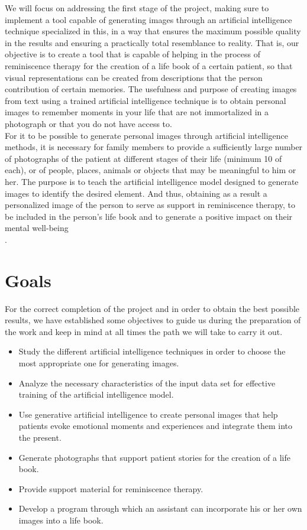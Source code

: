 We will focus on addressing the first stage of the project, making sure to implement a tool capable of generating images through an artificial intelligence technique specialized in this, in a way that ensures the maximum possible quality in the results and ensuring a practically total resemblance to reality. That is, our objective is to create a tool that is capable of helping in the process of reminiscence therapy for the creation of a life book of a certain patient, so that visual representations can be created from descriptions that the person contribution of certain memories. The usefulness and purpose of creating images from text using a trained artificial intelligence technique is to obtain personal images to remember moments in your life that are not immortalized in a photograph or that you do not have access to. \\

For it to be possible to generate personal images through artificial intelligence methods, it is necessary for family members to provide a sufficiently large number of photographs of the patient at different stages of their life (minimum 10 of each), or of people, places, animals or objects that may be meaningful to him or her. The purpose is to teach the artificial intelligence model designed to generate images to identify the desired element. And thus, obtaining as a result a personalized image of the person to serve as support in reminiscence therapy, to be included in the person's life book and to generate a positive impact on their mental well-being \\.


\section{Goals}

For the correct completion of the project and in order to obtain the best possible results, we have established some objectives to guide us during the preparation of the work and keep in mind at all times the path we will take to carry it out. 

\begin{itemize}
	\item Study the different artificial intelligence techniques in order to choose the most appropriate one for generating images. 
	\item Analyze the necessary characteristics of the input data set for effective training of the artificial intelligence model. 
	\item Use generative artificial intelligence to create personal images that help patients evoke emotional moments and experiences and integrate them into the present.
	\item Generate photographs that support patient stories for the creation of a life book.
	\item Provide support material for reminiscence therapy.
	\item Develop a program through which an assistant can incorporate his or her own images into a life book. 
	
\end{itemize} 

